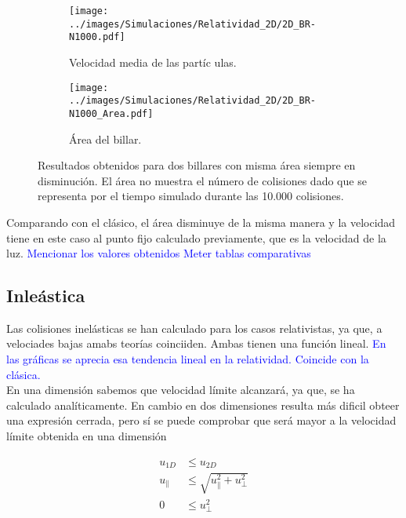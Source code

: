 \documentclass[11pt, spanish]{article}
\begin{document}
\begin{figure}[H]
    \begin{subfigure}[b]{0.5\textwidth}
        \centering
        \texttt{[image: ../images/Simulaciones/Relatividad\_2D/2D\_BR-N1000.pdf]}
        \caption{Velocidad media de las partíc  ulas.}
    \end{subfigure}
    \hfill
    \begin{subfigure}[b]{0.5\textwidth}
        \centering
        \texttt{[image: ../images/Simulaciones/Relatividad\_2D/2D\_BR-N1000\_Area.pdf]}
        \caption{Área del billar.}
    \end{subfigure}
    \caption{Resultados obtenidos para dos billares con misma área siempre en disminución. El área no muestra el número de colisiones dado que se representa por el tiempo simulado durante las 10.000 colisiones.}
    \label{fig:2DR_BR-N1000_con_Area}
\end{figure}

Comparando con el clásico, el área disminuye de la misma manera y la velocidad tiene en este caso al punto fijo calculado previamente, que es la velocidad de la luz. \textcolor{blue}{Mencionar los valores obtenidos} \textcolor{blue}{Meter tablas comparativas}

\subsection{Inleástica}

Las colisiones inelásticas se han calculado para los casos relativistas, ya que, a velociades bajas amabs teorías coinciiden. Ambas tienen una función lineal. \textcolor{blue}{En las gráficas se aprecia esa tendencia lineal en la relatividad. Coincide con la clásica.}\\

En una dimensión sabemos que velocidad límite alcanzará, ya que, se ha calculado analíticamente. En cambio en dos dimensiones resulta más dificil obteer una expresión cerrada, pero sí se puede comprobar que será mayor a la velocidad límite obtenida en una dimensión 

\begin{align}
    u_{1D} &\leq u_{2D} \nonumber\\
    u_{\parallel} &\leq \sqrt{u_\parallel^2 + u_\perp^2}\\
     0 &\leq u_\perp^2 \nonumber
\end{align}
\end{document}
